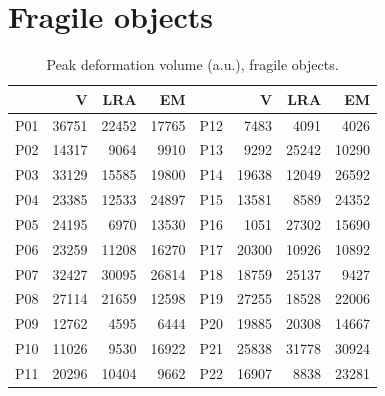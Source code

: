 \documentclass[12pt, a4paper, twoside, openright]{report}
\begin{document}
\section*{Fragile objects}

\begin{table}[ht]
    \centering
    \small
    \caption{Peak deformation volume (a.u.), fragile objects.}
    \label{tab:appB-frag-peak}
    \begin{tabular}{@{}lrrr@{\hspace{2em}}lrrr@{}}
        \toprule
            & V     & LRA   & EM    &     & V     & LRA   & EM    \\
        \midrule
        P01 & 36751 & 22452 & 17765 & P12 & 7483  & 4091  & 4026  \\
        P02 & 14317 & 9064  & 9910  & P13 & 9292  & 25242 & 10290 \\
        P03 & 33129 & 15585 & 19800 & P14 & 19638 & 12049 & 26592 \\
        P04 & 23385 & 12533 & 24897 & P15 & 13581 & 8589  & 24352 \\
        P05 & 24195 & 6970  & 13530 & P16 & 1051  & 27302 & 15690 \\
        P06 & 23259 & 11208 & 16270 & P17 & 20300 & 10926 & 10892 \\
        P07 & 32427 & 30095 & 26814 & P18 & 18759 & 25137 & 9427  \\
        P08 & 27114 & 21659 & 12598 & P19 & 27255 & 18528 & 22006 \\
        P09 & 12762 & 4595  & 6444  & P20 & 19885 & 20308 & 14667 \\
        P10 & 11026 & 9530  & 16922 & P21 & 25838 & 31778 & 30924 \\
        P11 & 20296 & 10404 & 9662  & P22 & 16907 & 8838  & 23281 \\
        \bottomrule
    \end{tabular}
\end{table}
\end{document}
